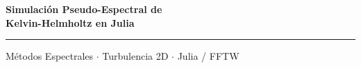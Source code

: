 \documentclass[aspectratio=169, 12pt]{beamer}
\begin{document}
\begin{frame}
  \begin{center}
    \vspace{1cm}
    {\Large\bfseries\color{azulprincipal}
      Simulación Pseudo-Espectral de\\
      Kelvin-Helmholtz en Julia
    }

    \vspace{1cm}
    \textcolor{gray}{\rule{0.5\textwidth}{0.4pt}}
    \vspace{0.5cm}

    {\normalsize
      Métodos Espectrales $\cdot$
      Turbulencia 2D $\cdot$
      Julia / FFTW
    }
  \end{center}
\end{frame}
\end{document}
